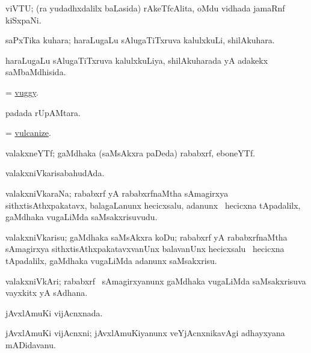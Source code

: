 \bentry
{} 
\gl{\nA}
\expl{}
\bmng
 viVTU; (ra yudadhxdalilx baLasida) rAkeTfcAlita, oMdu vidhada jamaRnf kiSxpaNi. 
\emng
\eentry

\bentry
{} 
\gl{\nA}
\expl{}
\bmng
 saPxTika kuhara; haraLugaLu sAlugaTiTxruva kalulxkuLi, shilAkuhara. 
\emng
\eentry

\bentry 
{} 
\gl{\gu}
\expl{}
\bmng
 haraLugaLu sAlugaTiTxruva kalulxkuLiya, shilAkuharada yA adakekx saMbaMdhisida. 
\emng
\eentry

\bentry
{} 
\gl{\gu}
\expl{}
\bmng
 = \hyperlink{vuggy}{vuggy}. 
\emng
\eentry

\bentry 
{} 
\gl{\gu}
\expl{}
\bmng
  padada rUpAMtara. 
\emng
\eentry

\bentry
{} 
\gl{\sakirx}
\expl{}
\bmng
 = \hyperlink{vulcanize}{vulcanize}. 
\emng
\eentry

\bentry
{}
\gl{\nA}
\expl{}
\bmng
 valakxneYTf; gaMdhaka (saMsAkxra paDeda) rababxrf, eboneYTf. 
\emng
\eentry

\bentry 
{} 
\gl{\gu}
\expl{}
\bmng
 valakxniVkarisabahudAda. 
\emng
\eentry

\bentry 
{} 
\gl{\nA}
\expl{}
\bmng
 valakxniVkaraNa; rababxrf yA rababxrfnaMtha sAmagirxya sithxtisAthxpakatavx, balagaLanunx hecicxsalu, adanunx \kanmu\ hecicxna tApadalilx, gaMdhaka \mo vugaLiMda saMsakxrisuvudu. 
\emng
\eentry

\bentry
{} 
\gl{\sakirx}
\expl{}
\bmng
 valakxniVkarisu; gaMdhaka saMsAkxra koDu; rababxrf yA rababxrfnaMtha sAmagirxya sithxtisAthxpakatavxvanUnx balavanUnx hecicxsalu \kanmu\ hecicxna tApadalilx, gaMdhaka \mo vugaLiMda adanunx saMsakxrisu. 
\emng
\eentry

\bentry 
{} 
\gl{\nA}
\expl{}
\bmng
 valakxniVkAri; rababxrf \mo\ sAmagirxyanunx gaMdhaka \mo vugaLiMda saMsakxrisuva vayxkitx yA sAdhana. 
\emng
\eentry

\bentry
{} 
\gl{\gu}
\expl{}
\bmng
 jAvxlAmuKi vijAcnxnada. 
\emng
\eentry

\bentry
{} 
\gl{\nA}
\expl{}
\bmng
 jAvxlAmuKi vijAcnxni; jAvxlAmuKiyanunx veYjAcnxnikavAgi adhayxyana mADidavanu. 
\emng
\eentry

